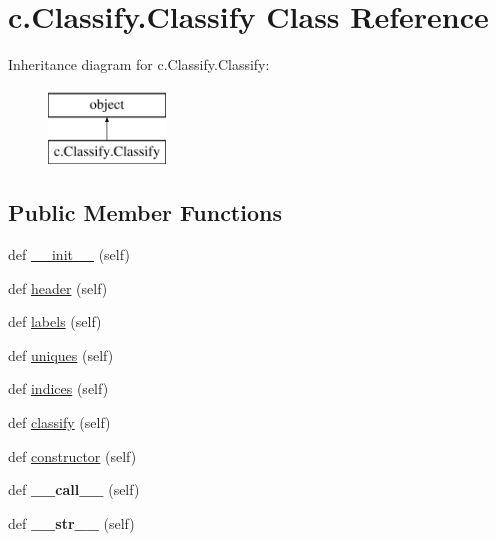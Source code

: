 \hypertarget{classc_1_1_classify_1_1_classify}{}\section{c.\+Classify.\+Classify Class Reference}
\label{classc_1_1_classify_1_1_classify}
Inheritance diagram for c.\+Classify.\+Classify\+:\begin{figure}[H]
\begin{center}
\leavevmode
\includegraphics[height=2.000000cm]{classc_1_1_classify_1_1_classify}
\end{center}
\end{figure}
\subsection*{Public Member Functions}
\begin{DoxyCompactItemize}
\item 
def \hyperlink{classc_1_1_classify_1_1_classify_a398279537ff57bdd2d903fdfa2c398bf}{\+\_\+\+\_\+init\+\_\+\+\_\+} (self)
\item 
def \hyperlink{classc_1_1_classify_1_1_classify_a76c7951d7b300167925e145e58ed3fa3}{header} (self)
\item 
def \hyperlink{classc_1_1_classify_1_1_classify_a5d8e1a6fbcbab785107f9e3a40b7e154}{labels} (self)
\item 
def \hyperlink{classc_1_1_classify_1_1_classify_ace6a8a06833cfe31d3abcbce270817ad}{uniques} (self)
\item 
def \hyperlink{classc_1_1_classify_1_1_classify_a7c4ec3de2e18e3db3a03ddbca71ccba6}{indices} (self)
\item 
def \hyperlink{classc_1_1_classify_1_1_classify_ae0bfdd4ee16c94394efc666b4c501bcc}{classify} (self)
\item 
def \hyperlink{classc_1_1_classify_1_1_classify_ab723602c25ed262d0c38114d6f8da7bc}{constructor} (self)
\item 
\hypertarget{classc_1_1_classify_1_1_classify_a178781aedac62cb6da8ef6cd71071b12}{}def {\bfseries \+\_\+\+\_\+call\+\_\+\+\_\+} (self)\label{classc_1_1_classify_1_1_classify_a178781aedac62cb6da8ef6cd71071b12}

\item 
\hypertarget{classc_1_1_classify_1_1_classify_a45fb26bfae7f894804ed286cac33f379}{}def {\bfseries \+\_\+\+\_\+str\+\_\+\+\_\+} (self)\label{classc_1_1_classify_1_1_classify_a45fb26bfae7f894804ed286cac33f379}

\end{DoxyCompactItemize}
